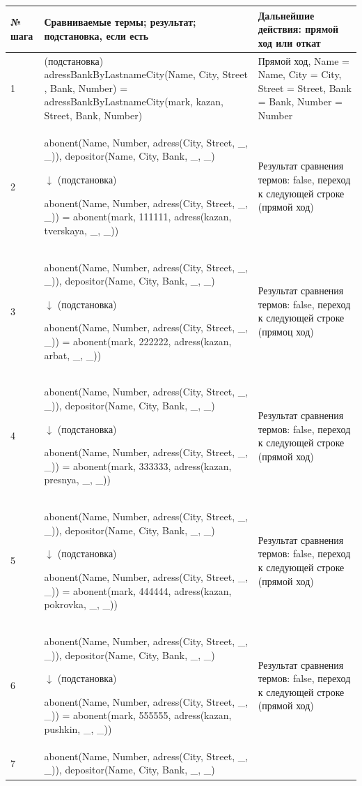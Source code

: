 \documentclass[a4paper,14pt]{extreport} %
\begin{document}
\begin{longtable}{|p{1.1cm}|p{8.5cm}|p{7cm}|}
	\hline
 	№ шага & Сравниваемые термы; результат; подстановка, если есть  & Дальнейшие действия: прямой ход или откат \\ \hline
	1 & (подстановка)
	adressBankByLastnameCity(Name, City, Street , Bank, Number) = adressBankByLastnameCity(mark, kazan, Street, Bank, Number) & Прямой ход, Name = Name, City = City, Street = Street, Bank = Bank, Number = Number \\ \hline
	2 & abonent(Name, Number, adress(City, Street, \_, \_)), depositor(Name, City, Bank, \_, \_)
	
		$\downarrow$ (подстановка)
	
	abonent(Name, Number, adress(City, Street, \_, \_)) = abonent(mark, 111111, adress(kazan, tverskaya, \_, \_)) & Результат сравнения термов: false, переход к следующей строке (прямой ход) \\ \hline
	3& abonent(Name, Number, adress(City, Street, \_, \_)), depositor(Name, City, Bank, \_, \_)
	
		$\downarrow$  (подстановка)
	
	abonent(Name, Number, adress(City, Street, \_, \_)) = abonent(mark, 222222, adress(kazan, arbat, \_, \_)) & Результат сравнения термов: false, переход к следующей строке (прямоц ход)  \\ \hline
	4 & abonent(Name, Number, adress(City, Street, \_, \_)), depositor(Name, City, Bank, \_, \_)
	
		$\downarrow$  (подстановка)
	
	abonent(Name, Number, adress(City, Street, \_, \_)) = abonent(mark, 333333, adress(kazan, presnya, \_, \_)) & Результат сравнения термов: false, переход к следующей строке (прямой ход)  \\ \hline
	5 & abonent(Name, Number, adress(City, Street, \_, \_)), depositor(Name, City, Bank, \_, \_)
	
		$\downarrow$  (подстановка)
	
	abonent(Name, Number, adress(City, Street, \_, \_)) = abonent(mark, 444444, adress(kazan, pokrovka, \_, \_)) & Результат сравнения термов: false, переход к следующей строке (прямой ход)  \\ \hline
	6 & abonent(Name, Number, adress(City, Street, \_, \_)), depositor(Name, City, Bank, \_, \_) 
	
		$\downarrow$  (подстановка)
	
	abonent(Name, Number, adress(City, Street, \_, \_)) = abonent(mark, 555555, adress(kazan, pushkin, \_, \_)) & Результат сравнения термов: false, переход к следующей строке (прямой ход)  \\ \hline
	7 & abonent(Name, Number, adress(City, Street, \_, \_)), depositor(Name, City, Bank, \_, \_)
	

\end{longtable}
\end{document}
